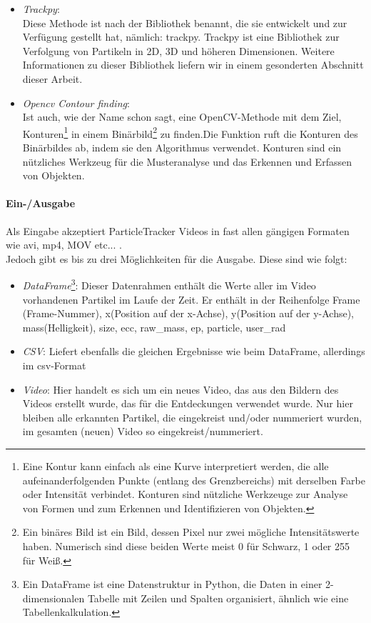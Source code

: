 \begin{itemize}
   \item \textit{Trackpy}:\\ Diese Methode ist nach der Bibliothek benannt, die sie entwickelt und zur Verfügung gestellt hat, nämlich: trackpy.  Trackpy ist eine Bibliothek zur Verfolgung von Partikeln in 2D, 3D und höheren Dimensionen. Weitere Informationen zu dieser Bibliothek liefern wir in einem gesonderten Abschnitt dieser Arbeit.
   
   \item \textit{Opencv Contour finding}:\\ Ist auch, wie der Name schon sagt, eine OpenCV-Methode mit dem Ziel, Konturen\footnote{Eine Kontur kann einfach als eine Kurve interpretiert werden, die alle aufeinanderfolgenden Punkte (entlang des Grenzbereichs) mit derselben Farbe oder Intensität verbindet. Konturen sind nützliche Werkzeuge zur Analyse von Formen und zum Erkennen und Identifizieren von Objekten.} in einem Binärbild\footnote{Ein binäres Bild ist ein Bild, dessen Pixel nur zwei mögliche Intensitätswerte haben. Numerisch sind diese beiden Werte meist 0 für Schwarz, 1 oder 255 für Weiß.} zu finden.Die Funktion ruft die Konturen des Binärbildes ab, indem sie den Algorithmus \cite{topological_contour_finding} verwendet. Konturen sind ein nützliches Werkzeug für die Musteranalyse und das Erkennen und Erfassen von Objekten.
\end{itemize}

    \paragraph{Ein-/Ausgabe \\} 
    Als Eingabe akzeptiert ParticleTracker Videos in fast allen gängigen Formaten wie avi, mp4, MOV etc... .\\

Jedoch gibt es bis zu drei Möglichkeiten für die Ausgabe. Diese sind wie folgt:
\begin{itemize}
\item \textit{DataFrame}\footnote{Ein DataFrame ist eine Datenstruktur in Python, die Daten in einer 2-dimensionalen Tabelle mit Zeilen und Spalten organisiert, ähnlich wie eine Tabellenkalkulation.}: Dieser Datenrahmen enthält die Werte aller im Video vorhandenen Partikel im Laufe der Zeit. Er enthält in der Reihenfolge Frame (Frame-Nummer), x(Position auf der x-Achse), y(Position auf der y-Achse), mass(Helligkeit), size, ecc, raw\_mass, ep, particle, user\_rad

\item \textit{CSV}: Liefert ebenfalls die gleichen Ergebnisse wie beim DataFrame, allerdings im csv-Format

\item \textit{Video}: Hier handelt es sich um ein neues Video, das aus den Bildern des Videos erstellt wurde, das für die Entdeckungen verwendet wurde. Nur hier bleiben alle erkannten Partikel, die eingekreist und/oder nummeriert wurden, im gesamten (neuen) Video so eingekreist/nummeriert.
\end{itemize}



